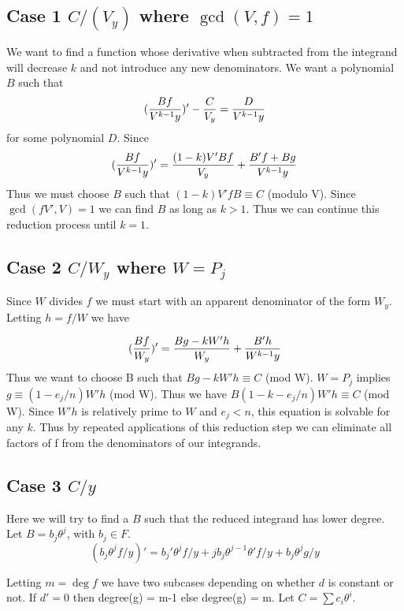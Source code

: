 \subsection{Case 1 $C / ( V_ y)$ where $\gcd(V,f)=1$}

We want to find a function whose derivative when subtracted from
the integrand will decrease $k$ and not introduce any new denominators.
We want a polynomial $B$ such that
\[
({Bf \over  V^{k-1} y} )' - {C \over V_ y} = {D \over V^{k-1}y}
\]
for some polynomial $D$. Since
\[
({Bf \over V^{k-1} y})' = {(1-k) V' B f \over V_ y} +
{B'f + Bg \over V^{k-1} y}
\]
Thus we must choose $B$ such that $(1-k) V'fB \equiv C $ (modulo V).
Since $\gcd(fV',V)=1$ we can find $B$ as long as $k > 1$.  Thus we can
continue this reduction process until $k=1$.

\subsection{Case 2  $C / { W_ y}$ where $W = P_j$}

Since $W$ divides $f$ we must start with an apparent denominator
of the form $W_ y$. Letting $h = f / W$ we have

\[
( { B f \over W_ y} )' = 
{B g - k W' h \over W_ y} + {B' h \over W^{k-1} y}
\]
Thus we want to choose B such that $Bg-kW' h \equiv C$ (mod W).
$W = P_j$ implies $g \equiv (1-e_j /n) W' h$ (mod W).
Thus we have $B(1-k-e_j /n) W' h \equiv C$ (mod W).
Since $W'h$ is relatively prime to $W$ and $e_j < n$, this
equation is solvable for any $k$.  Thus by repeated applications
of this reduction step we can eliminate all factors of f from the
denominators of our integrands.

\subsection{Case 3 $C / y$}

Here we will try to find a $B$ such that the reduced integrand has
lower degree. Let $B = b_j \theta^j$, with $b_j \in F$.
\begin{equation}
(b_j \theta^j f / y)' = b_j' \theta^j f /y + j 
b_j \theta^{j-1} \theta' f/y + b_j \theta^j g/y
\label{Simple:Int:Alg:Eq:a}
\end{equation}

Letting $m = \deg f$ we have two subcases depending on whether
$d$ is constant or not.  If $d' = 0$ then degree(g) = m-1
else degree(g) = m. Let $C = \sum c_i \theta^i$.


